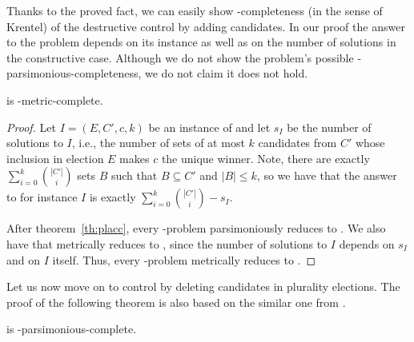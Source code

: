 Thanks to the proved fact, we can easily show \sharpPclass-completeness (in the sense of Krentel) of the destructive control by adding candidates.
In our proof the answer to the problem depends on its instance as well as on the number of solutions in the constructive case.
Although we do not show the problem's possible \sharpPclass-parsimonious-completeness, we do not claim it does not hold.

\begin{theorem} \label{th:placd}
	 is \sharpPclass-metric-complete.
\end{theorem}

\begin{proof}
Let $I=(E,C',c,k)$ be an instance of  and let $s_I$ be the number of solutions to $I$, i.e., the number of sets of at most $k$ candidates from $C'$ whose inclusion in election $E$ makes $c$ the unique winner.
Note, there are exactly $\sum_{i=0}^k\binom{|C'|}{i}$ sets $B$ such that $B\subseteq C'$ and $|B|\le k$, so we have that the answer to  for instance $I$ is exactly $\sum_{i=0}^k\binom{|C'|}{i}-s_I$.

After theorem~\ref{th:placc}, every \sharpPclass-problem parsimoniously reduces to .
We also have that  metrically reduces to , since the number of solutions to $I$ depends on $s_I$ and on $I$ itself.
Thus, every \sharpPclass-problem metrically reduces to .
\end{proof}

Let us now move on to control by deleting candidates in plurality elections.
The proof of the following theorem is also based on the similar one from \cite{faliszewski7}.

\begin{theorem} \label{th:pldcc}
     is \sharpPclass-parsimonious-complete.
\end{theorem}

